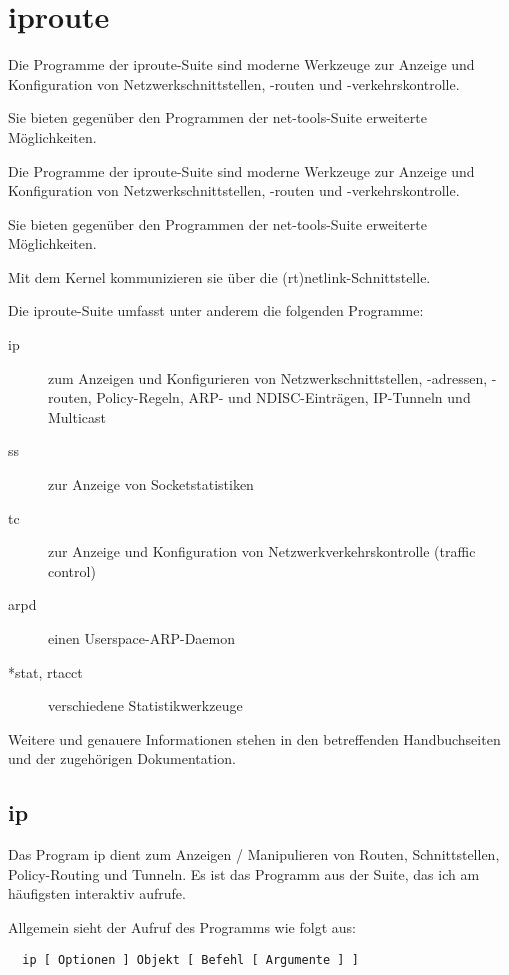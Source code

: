 \section{iproute}
\label{sec:netz-werkzeuge-iproute}
\begin{abstractsec}
  Die Programme der iproute-Suite sind moderne Werkzeuge zur Anzeige und
  Konfiguration von Netzwerkschnittstellen, -routen und -verkehrskontrolle.

  Sie bieten gegenüber den Programmen der net-tools-Suite erweiterte
  Möglichkeiten.
\end{abstractsec}
\begin{normaltext}
  Die Programme der iproute-Suite sind moderne Werkzeuge zur Anzeige und
  Konfiguration von Netzwerkschnittstellen, -routen und -verkehrskontrolle.

  Sie bieten gegenüber den Programmen der net-tools-Suite erweiterte
  Möglichkeiten.

  Mit dem Kernel kommunizieren sie über die (rt)netlink-Schnittstelle.

  Die iproute-Suite umfasst unter anderem die folgenden Programme:
  \begin{description}
    \item[ip] zum Anzeigen und Konfigurieren von Netzwerkschnittstellen,
      -adressen, -routen, Policy-Regeln, ARP- und NDISC-Einträgen, IP-Tunneln
      und Multicast
    \item[ss] zur Anzeige von Socketstatistiken
    \item[tc] zur Anzeige und Konfiguration von Netzwerkverkehrskontrolle
      (traffic control)
    \item[arpd] einen Userspace-ARP-Daemon
    \item[*stat, rtacct] verschiedene Statistikwerkzeuge
  \end{description}

  Weitere und genauere Informationen stehen in den betreffenden Handbuchseiten
  und der zugehörigen Dokumentation.

  \subsection*{ip}

  Das Program ip dient zum Anzeigen / Manipulieren von Routen, Schnittstellen,
  Policy-Routing und Tunneln. Es ist das Programm aus der Suite, das ich am
  häufigsten interaktiv aufrufe.

  Allgemein sieht der Aufruf des Programms wie folgt aus:
  \begin{verbatim}
  ip [ Optionen ] Objekt [ Befehl [ Argumente ] ]
  \end{verbatim}


\end{normaltext}
